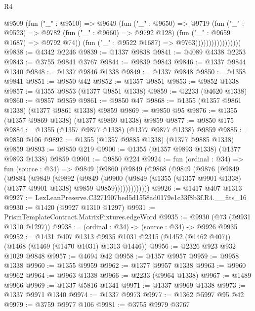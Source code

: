 \begin{lexlean}{R4}
\begin{coremodule}
                              @9509
                                (fun ("_" : @9510) =>
                                @9649
                                  (fun ("_" : @9650) =>
                                  @9719
                                    (fun ("_" : @9523) =>
                                    @9782
                                      (fun ("_" : @9660) => @9792 @128)
                                      (fun ("_" : @9659 @1687) => @9792 @74))
                                    (fun ("_" : @9522 @1687) => @9763)))))))))))))))))
@9838 := @4342 @2246
@9839 := @1337 @9838
@9841 := @4089 @4338 @2253
@9843 := @3755 @9841 @3767
@9844 := @9839 @9843
@9846 := @1337 @9844 @1340
@9848 := @1337 @9846 @1338
@9849 := @1337 @9848
@9850 := @1358 @9841
@9851 := @9850 @42
@9852 := @1357 @9851
@9853 := @9852 @1338
@9857 := @1355 @9853 (@1377 @9851 @1338)
@9859 := @2233 (@4620 @1338)
@9860 := @9857 @9859
@9861 := @9850 @47
@9868 := @1355 (@1357 @9861 @1338) (@1377 @9861 @1338) @9859
@9869 := @9850 @95
@9876 := @1355 (@1357 @9869 @1338) (@1377 @9869 @1338) @9859
@9877 := @9850 @175
@9884 := @1355 (@1357 @9877 @1338) (@1377 @9877 @1338) @9859
@9885 := @9850 @106
@9892 := @1355 (@1357 @9885 @1338) (@1377 @9885 @1338) @9859
@9893 := @9850 @219
@9900 := @1355 (@1357 @9893 @1338) (@1377 @9893 @1338) @9859
@9901 := @9850 @224
@9924 := fun (ordinal : @34) =>
  fun (source : @34) =>
  @9849
    (@9860
      (@9849
        (@9868
          (@9849
            (@9876
              (@9849
                (@9884
                  (@9849
                    (@9892
                      (@9849
                        (@9900
                          (@9849
                            (@1355 (@1357 @9901 @1338) (@1377 @9901 @1338) @9859 @9859)))))))))))))
@9926 := @1417 @407 @1313
@9927 := LexLeanPreserve.C3271907bed5d1558ad0179e1c33f8b3f.R4.__fits_16
@9930 := @1420 (@9927 @1310 @1297)
@9931 := PrismTemplateContract.MatrixFixtures.edgeWord
@9935 := @9930 (@73 (@9931 @1310 @1297))
@9938 := (ordinal : @34) -> (source : @34) -> @9926 @9935
@9952 := @1431
    @407
    @1313
    @9935
    @1031
    @2315
    (@1452 (@1462 @407))
    (@1468 (@1469 (@1470 @1031) @1313 @1446))
@9956 := @2326 @923 @932 @1029 @9848
@9957 := @4694 @42
@9958 := @1357 @9957
@9959 := @9958 @1338
@9960 := @1355 @9959
@9962 := @1377 @9957 @1338
@9963 := @9960 @9962
@9964 := @9963 @1338
@9966 := @2233 (@9964 @1338)
@9967 := @1489 @9966
@9969 := @1337 @5816 @1341
@9971 := @1337 @9969 @1338
@9973 := @1337 @9971 @1340
@9974 := @1337 @9973
@9977 := @1362 @5997 @95 @42
@9979 := @3759 @9977 @106
@9981 := @3755 @9979 @3767

\end{coremodule}
\end{lexlean}
